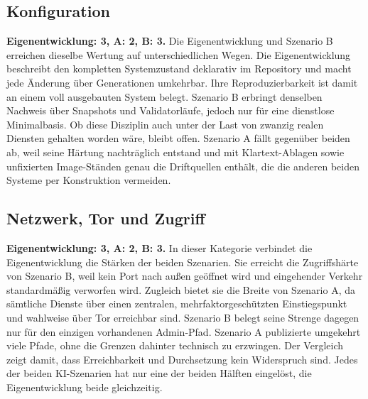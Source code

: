 {\subsection{Konfiguration}
\textbf{Eigenentwicklung: 3, A: 2, B: 3.} Die Eigenentwicklung und Szenario B erreichen dieselbe Wertung auf unterschiedlichen Wegen. 
Die Eigenentwicklung beschreibt den kompletten Systemzustand deklarativ im Repository und macht
jede Änderung über Generationen umkehrbar. Ihre Reproduzierbarkeit ist damit an einem voll ausgebauten System belegt.
Szenario B erbringt denselben Nachweis über Snapshots und Validatorläufe, jedoch nur für eine dienstlose
Minimalbasis. Ob diese Disziplin auch unter der Last von zwanzig realen Diensten gehalten worden wäre, bleibt offen. 
Szenario A fällt gegenüber beiden ab, weil seine Härtung nachträglich entstand und mit Klartext-Ablagen sowie unfixierten Image-Ständen genau die Driftquellen enthält, die die anderen beiden Systeme per Konstruktion vermeiden.\cite{runbookA,selfauditA,implementationlogB,validatornotesB}

\subsection{Netzwerk, Tor und Zugriff}
\textbf{Eigenentwicklung: 3, A: 2, B: 3.} In dieser Kategorie verbindet die Eigenentwicklung die Stärken der beiden Szenarien. Sie erreicht die Zugriffshärte von Szenario B, weil kein Port nach außen geöffnet wird und eingehender Verkehr standardmäßig verworfen wird. Zugleich bietet sie die Breite von Szenario A, da sämtliche Dienste über einen zentralen, mehrfaktorgeschützten Einstiegspunkt und wahlweise über Tor erreichbar sind.
Szenario B belegt seine Strenge dagegen nur für den einzigen vorhandenen Admin-Pfad. 
Szenario A publizierte umgekehrt viele Pfade, ohne die Grenzen dahinter technisch zu erzwingen. Der Vergleich zeigt damit, dass Erreichbarkeit und Durchsetzung kein Widerspruch sind. 
Jedes der beiden \ac{KI}-Szenarien hat nur eine der beiden Hälften eingelöst, die Eigenentwicklung beide gleichzeitig.\cite{runbookA,selfauditA,finalsummaryB,validatornotesB}

}
